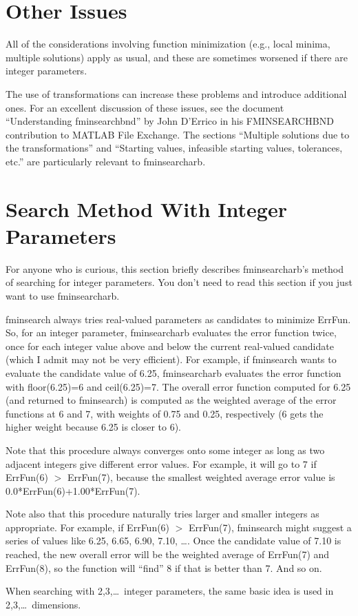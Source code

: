 \documentclass{article}
\begin{document}
\section{Other Issues}

All of the considerations involving function minimization (e.g., local minima, multiple solutions) apply as usual,
and these are sometimes worsened if there are integer parameters.

The use of transformations can increase these problems and introduce additional ones.
For an excellent discussion of these issues, see the document ``Understanding fminsearchbnd'' by John D'Errico
in his FMINSEARCHBND contribution to MATLAB File Exchange.
The sections  ``Multiple solutions due to the transformations''
and  ``Starting values, infeasible starting values, tolerances, etc.''
are particularly relevant to fminsearcharb.


\section{Search Method With Integer Parameters}

For anyone who is curious, this section briefly describes fminsearcharb's method of searching for integer parameters.
You don't need to read this section if you just want to use fminsearcharb.

fminsearch always tries real-valued parameters as candidates to minimize ErrFun.
So, for an integer parameter, fminsearcharb evaluates the error function twice, once for
each integer value above and below the current real-valued candidate (which I admit may
not be very efficient).
For example, if fminsearch wants to evaluate the candidate value of 6.25, fminsearcharb
evaluates the error function with floor(6.25)=6 and ceil(6.25)=7.
The overall error function computed for 6.25 (and returned to fminsearch) is computed as
the weighted average of the error functions at 6 and 7, with weights of 0.75 and 0.25,
respectively (6 gets the higher weight because 6.25 is closer to 6).

Note that this procedure always converges onto some integer as long as two adjacent integers give
different error values.
For example, it will go to 7 if ErrFun(6) $>$ ErrFun(7), because the smallest weighted average error value
is 0.0*ErrFun(6)+1.00*ErrFun(7).

Note also that this procedure naturally tries larger and smaller integers as appropriate.
For example, if ErrFun(6) $>$ ErrFun(7), fminsearch might suggest a series of values like
6.25, 6.65, 6.90, 7.10, \ldots.
Once the candidate value of 7.10 is reached, the new overall error will be the weighted average
of ErrFun(7) and ErrFun(8), so the function will ``find'' 8 if that is better than 7.
And so on.

When searching with 2,3,\ldots\ integer parameters, the same basic idea is used in 2,3,\ldots\ dimensions.
\end{document}
